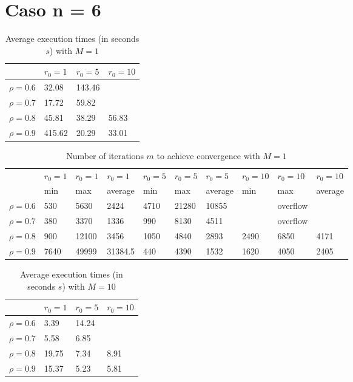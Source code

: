 \documentclass[a4paper,11pt,openright]{report}
\begin{document}
\section*{Caso n = 6} 
\begin{table}[H]
\centering
\addtolength{\leftskip}{-1.5cm}
\addtolength{\rightskip}{-1.5cm}
\begin{tabular}{|c|lll|}
\hline
$ $ & $r_0 = 1$ & $r_0 = 5$ & $r_0 = 10$ \\
\hline
$\rho = 0.6$ & 32.08 & 143.46 &  \\

$\rho = 0.7$ & 17.72 & 59.82 &  \\

$\rho = 0.8$ & 45.81 & 38.29 & 56.83 \\

$\rho = 0.9$ & 415.62 & 20.29 & 33.01 \\
\hline
\end{tabular}
\caption{Average execution
 times (in seconds $s$) with $M = 1$}
\end{table}
\begin{table}[H]
\centering
\addtolength{\leftskip}{-1.5cm}
\addtolength{\rightskip}{-1.5cm}
\begin{tabular}{|c|lllllllll|}
\hline
$ $ & $r_0 = 1$ & $r_0 = 1$ & $r_0 = 1$ & $r_0 = 5$ & $r_0 = 5$ & $r_0 = 5$ & $r_0 = 10$ & $r_0 = 10$ & $r_0 = 10$  \\
$ $ & min & max & average & min & max & average & min & max & average \\ 
\hline
$\rho = 0.6$ & 530 & 5630 & 2424 & 4710 & 21280 & 10855 &  & overflow &  \\

$\rho = 0.7$ & 380 & 3370 & 1336 & 990 & 8130 & 4511 &  & overflow &  \\

$\rho = 0.8$ & 900 & 12100 & 3456 & 1050 & 4840 & 2893 & 2490 & 6850 & 4171 \\

$\rho = 0.9$ & 7640 & 49999 & 31384.5 & 440 & 4390 & 1532 & 1620 & 4050 & 2405\\
\hline
\end{tabular}
\caption{Number of iterations $m$ to achieve convergence with $M = 1$}
\end{table}
\begin{table}[H]
\centering
\addtolength{\leftskip}{-1.5cm}
\addtolength{\rightskip}{-1.5cm}
\begin{tabular}{|c|lll|}
\hline
$ $ & $r_0 = 1$ & $r_0 = 5$ & $r_0 = 10$ \\
\hline
$\rho = 0.6$ & 3.39 & 14.24 &  \\

$\rho = 0.7$ & 5.58 & 6.85 &  \\

$\rho = 0.8$ & 19.75 & 7.34 & 8.91 \\

$\rho = 0.9$ & 15.37 & 5.23 & 5.81 \\
\hline
\end{tabular}
\caption{Average execution
 times (in seconds $s$) with $M = 10$}
\end{table}
\end{document}
